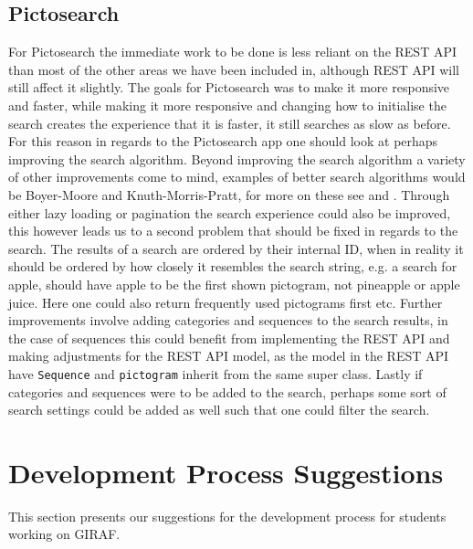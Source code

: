 \subsection*{Pictosearch}
For Pictosearch the immediate work to be done is less reliant on the REST API than most of the other areas we have been included in, although REST API will still affect it slightly.
The goals for Pictosearch was to make it more responsive and faster, while making it more responsive and changing how to initialise the search creates the experience that it is faster, it still searches as slow as before.
For this reason in regards to the Pictosearch app one should look at perhaps improving the search algorithm.
Beyond improving the search algorithm a variety of other improvements come to mind, examples of better search algorithms would be Boyer-Moore and Knuth-Morris-Pratt, for more on these see \cite{BoyerMoore} and \cite{KnuthMorrisPratt}.
Through either lazy loading or pagination the search experience could also be improved, this however leads us to a second problem that should be fixed in regards to the search.
The results of a search are ordered by their internal ID, when in reality it should be ordered by how closely it resembles the search string, e.g. a search for apple, should have apple to be the first shown pictogram, not pineapple or apple juice.
Here one could also return frequently used pictograms first etc.
Further improvements involve adding categories and sequences to the search results, in the case of sequences this could benefit from implementing the REST API and making adjustments for the REST API model, as the model in the REST API have \texttt{Sequence} and \texttt{pictogram} inherit from the same super class.
Lastly if categories and sequences were to be added to the search, perhaps some sort of search settings could be added as well such that one could filter the search.

\section{Development Process Suggestions}
This section presents our suggestions for the development process for students working on GIRAF.

